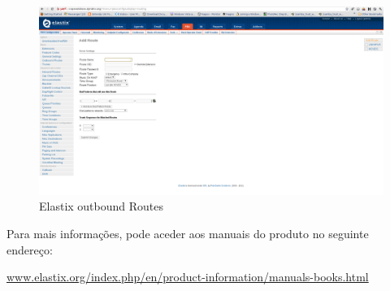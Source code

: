 \begin{figure}[H]
    \begin{center}
        \includegraphics[width=13cm]{include/img/elastix_pbx_outboundRoutes.png}
    \end{center}
    \caption{Elastix outbound Routes}
    \label{fig:elastix_pbx_outboundRoutes}
\end{figure}


Para mais informações, pode aceder aos manuais do produto no seguinte endereço: \begin{normalsize}\sffamily\href{http://www.elastix.org/index.php/en/product-information/manuals-books.html}{www.elastix.org/index.php/en/product-information/manuals-books.html}\end{normalsize}
